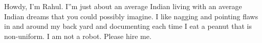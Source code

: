 

\begin{cvparagraph}

Howdy, I’m Rahul. I”m just about an average Indian living with an average Indian dreams that you could possibly imagine. I like nagging and
pointing flaws in and around my back yard and documenting each time I eat a peanut that is non-uniform. I am not a robot. Please hire me.

\end{cvparagraph}
